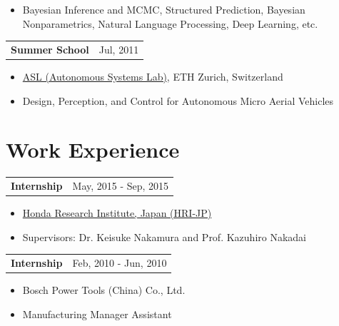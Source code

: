 \documentclass[margin,line]{res}
\begin{document}
\begin{resume}
\begin{itemize}
\vspace*{-2.5mm}
\item[] Bayesian Inference and MCMC, Structured Prediction, Bayesian Nonparametrics, Natural Language Processing, Deep Learning, etc.
\end{itemize}

\begin{tabularx}{\textwidth}{X r}
{\bf Summer School} & Jul, 2011\\
\end{tabularx}
\begin{itemize}
\item[] \href{http://www.asl.ethz.ch}{ASL (Autonomous Systems Lab)}, ETH Zurich, Switzerland

\vspace*{-2.5mm}
\item[] Design, Perception, and Control for Autonomous Micro Aerial Vehicles
\end{itemize}

\section{\sc Work Experience}

\begin{tabularx}{\textwidth}{X r}
{\bf Internship} & May, 2015 - Sep, 2015\\
\end{tabularx}
\begin{itemize}
\item[] \href{http://www.jp.honda-ri.com/english}{Honda Research Institute, Japan (HRI-JP)}

\vspace*{-2.5mm}
\item[] Supervisors: Dr. Keisuke Nakamura and Prof. Kazuhiro Nakadai
\end{itemize}

\begin{tabularx}{\textwidth}{X r}
{\bf Internship} & Feb, 2010 - Jun, 2010\\
\end{tabularx}
\begin{itemize}
\item[] Bosch Power Tools (China) Co., Ltd.

\vspace*{-2.5mm}
\item[] Manufacturing Manager Assistant
\end{itemize}


\end{resume}
\end{document}
